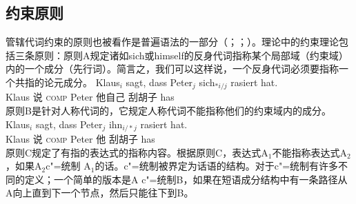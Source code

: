 \subsection{约束原则}

管辖代词约束的原则也被看作是普遍语法的一部分（\citealp[]{Chomsky98a-u}；\citealp*[]{CTK2009a}；\citealp[]{Rizzi2009a}）。\gbc 理论中的约束理论包括三条原则：原则A规定诸如sich或himself的反身代词指称某个局部域（约束域）内的一个成分（先行词）。简言之，我们可以这样说，一个反身代词必须要指称一个共指的论元成分。
\ea
\gll Klaus$_i$ sagt, dass Peter$_j$ sich$_{*i/j}$ rasiert hat.\\
     Klaus     说 \textsc{comp} Peter 他自己 刮胡子 has\\
\z
原则B是针对人称代词的，它规定人称代词不能指称他们的约束域内的成分。
\ea
\gll Klaus$_i$ sagt, dass Peter$_j$ ihn$_{i/*j}$ rasiert hat.\\
	 Klaus 说 \textsc{comp} Peter 他 刮胡子 has\\ 
\z
原则C规定了有指的表达式的指称内容。根据原则C，表达式A$_1$不能指称表达式A$_2$，如果A$_2$c"=统制 A$_1$的话。c"=统制被界定为话语的结构。对于c"=统制有许多不同的定义；一个简单的版本是A c"=统制B，如果在短语成分结构中有一条路径从A向上直到下一个节点，然后只能往下到B。

